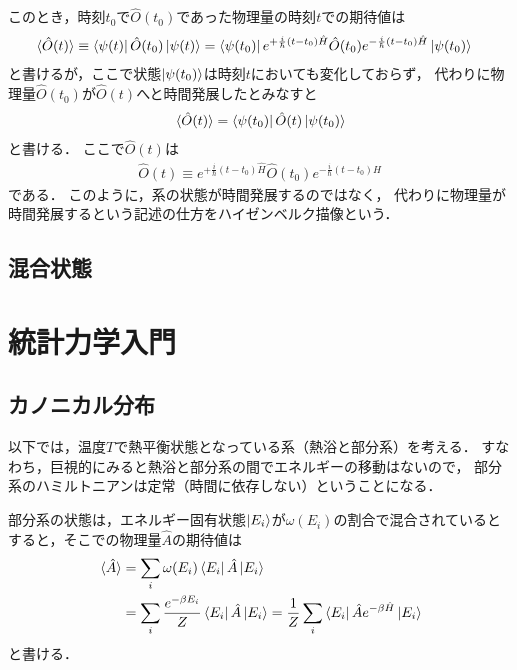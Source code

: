 \documentclass[uplatex,dvipdfmx]{vkaishi}
\begin{document}
このとき，時刻$t_0$で$\hat O(t_0)$であった物理量の時刻$t$での期待値は
\begin{align}
  \expval*{\hat O(t)}
    \equiv \bra{\psi(t)} \hat O(t_0) \ket{\psi(t)}
    &= \bra{\psi(t_0)} e^{+ \frac{i}{\hbar} (t - t_0) \hat H} \hat O(t_0) e^{- \frac{i}{\hbar} (t - t_0) \hat H} \ket{\psi(t_0)}
\end{align}
と書けるが，ここで状態$\ket{\psi(t_0)}$は時刻$t$においても変化しておらず，
代わりに物理量$\hat O(t_0)$が$\hat O(t)$へと時間発展したとみなすと
\begin{align}
  \expval*{\hat O(t)}
  = \bra{\psi(t_0)} \hat O(t) \ket{\psi(t_0)}
\end{align}
と書ける．
ここで$\hat O(t)$は
\begin{align}
  \hat O(t) \equiv e^{+ \frac{i}{\hbar} (t - t_0) \hat H} \hat O(t_0) e^{- \frac{i}{\hbar} (t - t_0) \hat H}
\end{align}
である．
このように，系の状態が時間発展するのではなく，
代わりに物理量が時間発展するという記述の仕方をハイゼンベルク描像という．

\subsection{混合状態}



\section{統計力学入門}

\subsection{カノニカル分布}

以下では，温度$T$で熱平衡状態となっている系（熱浴と部分系）を考える．
すなわち，巨視的にみると熱浴と部分系の間でエネルギーの移動はないので，
部分系のハミルトニアンは定常（時間に依存しない）ということになる．

部分系の状態は，エネルギー固有状態$\ket{E_i}$が$\omega(E_i)$の割合で混合されているとすると，そこでの物理量$\hat A$の期待値は
\begin{align}
  \expval*{\hat A}
  &= \sum_i \omega(E_i) \bra{E_i} \hat A \ket{E_i} \\
  &= \sum_i \frac{e^{-\beta E_i}}{Z} \bra{E_i} \hat A \ket{E_i}
  = \frac1Z \sum_i \bra{E_i} \hat A e^{-\beta \hat H} \ket{E_i}
\end{align}
と書ける．
\end{document}
